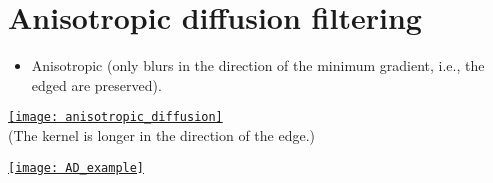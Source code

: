 \section{Anisotropic diffusion filtering}
\begin{itemize}
\item Anisotropic (only blurs in the direction of the minimum
  gradient, i.e., the edged are preserved).
\end{itemize}
\begin{center}
  \href{https://dsp.stackexchange.com/questions/14606/anisotropic-diffusion}{\texttt{[image: anisotropic\_diffusion]}}\\
  (The kernel is longer in the direction of the edge.)
\end{center}
\begin{center}
    \href{https://es.mathworks.com/help/images/ref/imdiffusefilt.html}{\texttt{[image: AD\_example]}}
\end{center}

